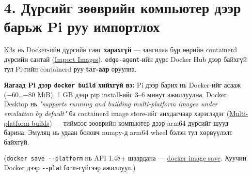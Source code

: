 \hypertarget{ux434ux4afux440ux441ux438ux439ux433-ux437ux4e9ux4e9ux432ux440ux438ux439ux43d-ux43aux43eux43cux43fux44cux44eux442ux435ux440-ux434ux44dux44dux440-ux431ux430ux440ux44cux436-pi-ux440ux443ux443-ux438ux43cux43fux43eux440ux442ux43bux43eux445}{%
\section{4. Дүрсийг зөөврийн компьютер дээр барьж Pi руу импортлох}\label{ux434ux4afux440ux441ux438ux439ux433-ux437ux4e9ux4e9ux432ux440ux438ux439ux43d-ux43aux43eux43cux43fux44cux44eux442ux435ux440-ux434ux44dux44dux440-ux431ux430ux440ux44cux436-pi-ux440ux443ux443-ux438ux43cux43fux43eux440ux442ux43bux43eux445}}

K3s нь Docker-ийн дүрсийн санг \textbf{харахгүй} --- зангилаа бүр өөрийн containerd дүрсийн сантай (\href{https://docs.k3s.io/add-ons/import-images}{Import Images}). \texttt{edge-agent}-ийн дүрс Docker Hub дээр байхгүй тул Pi-гийн containerd руу \textbf{tar-аар} оруулна.

\textbf{Яагаад Pi дээр \texttt{docker\ build} хийхгүй вэ:} Pi дээр барих нь Docker-ийг асааж (−60\ldots−80 MiB), 1 GB дээр pip install-ийг 3--6 минут ажиллуулна. Docker Desktop нь \emph{"supports running and building multi-platform images under emulation by default"} ба containerd image store-ийг анхдагчаар хэрэглэдэг (\href{https://docs.docker.com/build/building/multi-platform/}{Multi-platform builds}) --- тиймээс зөөврийн компьютер дээр arm64 дүрсийг шууд барина. Эмуляц нь удаан боловч numpy-д arm64 wheel бэлэн тул хөрвүүлэлт байхгүй.

\begin{Shaded}
\begin{Highlighting}[]
\OperatorTok{\textless{}}\OperatorTok{\textgreater{}}
\end{Highlighting}
\end{Shaded}

(\texttt{docker\ save\ -\/\allowbreak{}-platform} нь API 1.48+ шаардана --- \href{https://docs.docker.com/reference/cli/docker/image/save/}{docker image save}. Хуучин Docker дээр \texttt{-\/-platform}-гүйгээр ажиллуул.)

